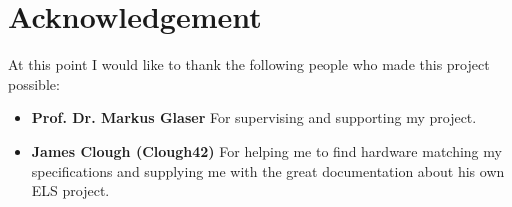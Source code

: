 \chapter*{Acknowledgement}
\label{acknowledgement}
At this point I would like to thank the following people who made this project possible:

\begin{itemize}
    \item \textbf{Prof. Dr. Markus Glaser} For supervising and supporting my project.
    \item \textbf{James Clough (Clough42)} For helping me to find hardware matching my specifications and supplying me with the great documentation about his own ELS project. 
\end{itemize}
